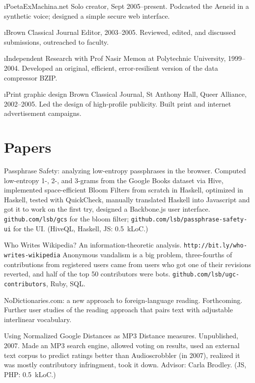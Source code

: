 \documentclass[11pt]{article}
\begin{document}
\i{PoetaExMachina.net} Solo creator, Sept 2005--present.
Podcasted the Aeneid in a synthetic voice; designed a simple secure web interface.

\i{Brown Classical Journal} Editor, 2003--2005.
Reviewed, edited, and discussed submissions, outreached to faculty.

\i{Independent Research} with Prof Nasir Memon at Polytechnic University, 1999--2004.
Developed an original, efficient, error-resilient version of the data compressor BZIP.

\i{Print graphic design} Brown Classical Journal, St Anthony Hall, Queer Alliance, 2002--2005.
Led the design of high-profile publicity.  Built print and internet advertisement campaigns.

\part{Papers}%
\p Passphrase Safety: analyzing low-entropy passphrases in the browser.
Computed low-entropy 1-, 2-, and 3-grams from the Google Books dataset via Hive, implemented space-efficient Bloom Filters from scratch in Haskell, optimized in Haskell, tested with QuickCheck, manually translated Haskell into Javascript and got it to work on the first try, designed a Backbone.js user interface.  \texttt{github.com/lsb/gcs} for the bloom filter; \texttt{github.com/lsb/passphrase-safety-ui} for the UI. (HiveQL, Haskell, JS: 0.5~kLoC.)

\p Who Writes Wikipedia? An information-theoretic analysis. \texttt{http://bit.ly/who-writes-wikipedia}
Anonymous vandalism is a big problem, three-fourths of contributions from registered users came from users who got one of their revisions reverted, and half of the top 50 contributors were bots. \texttt{github.com/lsb/ugc-contributors}, Ruby, SQL.


\p NoDictionaries.com: a new approach to foreign-language reading.  Forthcoming.
Further user studies of the reading approach that pairs text with adjustable interlinear vocabulary.

\p Using Normalized Google Distances as MP3 Distance measures.  Unpublished, 2007.
Made an MP3 search engine, allowed voting on results, used an external text corpus to predict ratings better than Audioscrobbler (in 2007), realized it was mostly contributory infringment, took it down. Advisor: {Carla Brodley}. (JS, PHP: 0.5~kLoC.)
\end{document}
